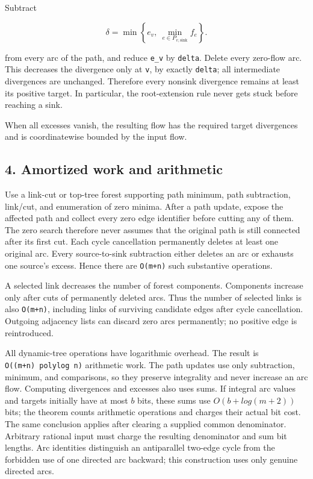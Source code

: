 Subtract

\[
\delta=\min\left\{e_v,\ \min_{e\in P_{v,\mathrm{sink}}}f_e\right\}.
\]

from every arc of the path, and reduce \texttt{e\_v} by \texttt{delta}. Delete every zero-flow arc. This decreases the divergence only at \texttt{v}, by exactly \texttt{delta}; all intermediate divergences are unchanged. Therefore every nonsink divergence remains at least its positive target. In particular, the root-extension rule never gets stuck before reaching a sink.

When all excesses vanish, the resulting flow has the required target divergences and is coordinatewise bounded by the input flow.

\hypertarget{af-32c0fc642d-amortized-work-and-arithmetic}{%
\subsection{4. Amortized work and arithmetic}\label{af-32c0fc642d-amortized-work-and-arithmetic}}

Use a link-cut or top-tree forest supporting path minimum, path subtraction, link/cut, and enumeration of zero minima. After a path update, expose the affected path and collect every zero edge identifier before cutting any of them. The zero search therefore never assumes that the original path is still connected after its first cut. Each cycle cancellation permanently deletes at least one original arc. Every source-to-sink subtraction either deletes an arc or exhausts one source's excess. Hence there are \texttt{O(m+n)} such substantive operations.

A selected link decreases the number of forest components. Components increase only after cuts of permanently deleted arcs. Thus the number of selected links is also \texttt{O(m+n)}, including links of surviving candidate edges after cycle cancellation. Outgoing adjacency lists can discard zero arcs permanently; no positive edge is reintroduced.

All dynamic-tree operations have logarithmic overhead. The result is \texttt{O((m+n)\ polylog\ n)} arithmetic work. The path updates use only subtraction, minimum, and comparisons, so they preserve integrality and never increase an arc flow. Computing divergences and excesses also uses sums. If integral arc values and targets initially have at most \(b\) bits, these sums use \(O(b+log(m+2))\) bits; the theorem counts arithmetic operations and charges their actual bit cost. The same conclusion applies after clearing a supplied common denominator. Arbitrary rational input must charge the resulting denominator and sum bit lengths. Arc identities distinguish an antiparallel two-edge cycle from the forbidden use of one directed arc backward; this construction uses only genuine directed arcs.

